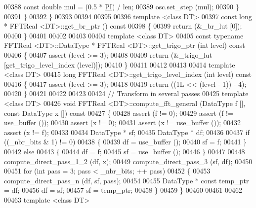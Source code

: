 \begin{DoxyCode}
00388             \textcolor{keyword}{const} \textcolor{keywordtype}{double}    mul = (0.5 * \hyperlink{a00142_a74ffcd4c90202b5240bbca7374dfd6fa}{PI}) / len;
00389             osc.set\_step (mul);
00390         \}
00391     \}
00392 \}
00393 
00394 
00395 
00396 \textcolor{keyword}{template} <\textcolor{keyword}{class} DT>
00397 \textcolor{keyword}{const} \textcolor{keywordtype}{long} *    FFTReal <DT>::get\_br\_ptr () \textcolor{keyword}{const}
00398 \{
00399     \textcolor{keywordflow}{return} (&\_br\_lut [0]);
00400 \}
00401 
00402 
00403 
00404 \textcolor{keyword}{template} <\textcolor{keyword}{class} DT>
00405 \textcolor{keyword}{const} \textcolor{keyword}{typename} FFTReal <DT>::DataType * FFTReal <DT>::get\_trigo\_ptr (\textcolor{keywordtype}{int} level) \textcolor{keyword}{const}
00406 \{
00407     assert (level >= 3);
00408 
00409     \textcolor{keywordflow}{return} (&\_trigo\_lut [get\_trigo\_level\_index (level)]);
00410 \}
00411 
00412 
00413 
00414 \textcolor{keyword}{template} <\textcolor{keyword}{class} DT>
00415 \textcolor{keywordtype}{long}    FFTReal <DT>::get\_trigo\_level\_index (\textcolor{keywordtype}{int} level) \textcolor{keyword}{const}
00416 \{
00417     assert (level >= 3);
00418 
00419     \textcolor{keywordflow}{return} ((1L << (level - 1)) - 4);
00420 \}
00421 
00422 
00423 
00424 \textcolor{comment}{// Transform in several passes}
00425 \textcolor{keyword}{template} <\textcolor{keyword}{class} DT>
00426 \textcolor{keywordtype}{void}    FFTReal <DT>::compute\_fft\_general (DataType f [], \textcolor{keyword}{const} DataType x []) \textcolor{keyword}{const}
00427 \{
00428     assert (f != 0);
00429     assert (f != use\_buffer ());
00430     assert (x != 0);
00431     assert (x != use\_buffer ());
00432     assert (x != f);
00433 
00434     DataType *      sf;
00435     DataType *      df;
00436 
00437     \textcolor{keywordflow}{if} ((\_nbr\_bits & 1) != 0)
00438     \{
00439         df = use\_buffer ();
00440         sf = f;
00441     \}
00442     \textcolor{keywordflow}{else}
00443     \{
00444         df = f;
00445         sf = use\_buffer ();
00446     \}
00447 
00448     compute\_direct\_pass\_1\_2 (df, x);
00449     compute\_direct\_pass\_3 (sf, df);
00450 
00451     \textcolor{keywordflow}{for} (\textcolor{keywordtype}{int} pass = 3; pass < \_nbr\_bits; ++ pass)
00452     \{
00453         compute\_direct\_pass\_n (df, sf, pass);
00454 
00455         DataType * \textcolor{keyword}{const}    temp\_ptr = df;
00456         df = sf;
00457         sf = temp\_ptr;
00458     \}
00459 \}
00460 
00461 
00462 
00463 \textcolor{keyword}{template} <\textcolor{keyword}{class} DT>

\end{DoxyCode}
